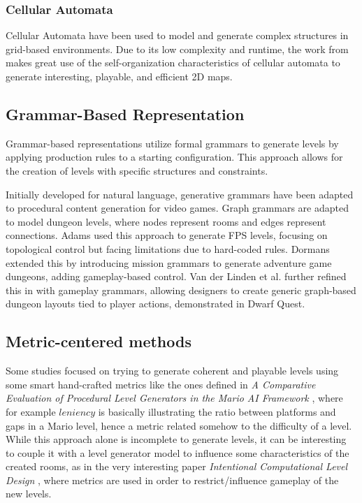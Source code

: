 \documentclass{article}
\begin{document}
\subsubsection{Cellular Automata}
Cellular Automata have been used to model and generate complex structures in grid-based environments. Due to its low complexity and runtime, the work from \cite{cellular} makes great use of the self-organization characteristics of cellular automata to generate interesting, playable, and efficient 2D maps.

\subsection{Grammar-Based Representation}
Grammar-based representations utilize formal grammars to generate levels by applying production rules to a starting configuration. This approach allows for the creation of levels with specific structures and constraints.

Initially developed for natural language, generative grammars have been adapted to procedural content generation for video games. Graph grammars are adapted to model dungeon levels, where nodes represent rooms and edges represent connections. Adams \cite{adams} used this approach to generate FPS levels, focusing on topological control but facing limitations due to hard-coded rules. Dormans \cite{dorm} extended this by introducing mission grammars to generate adventure game dungeons, adding gameplay-based control. Van der Linden et al. further refined this in \cite{linden} with gameplay grammars, allowing designers to create generic graph-based dungeon layouts tied to player actions, demonstrated in Dwarf Quest.

\subsection{Metric-centered methods}
Some studies focused on trying to generate coherent and playable levels using some smart hand-crafted metrics like the ones defined in \textit{A Comparative Evaluation of Procedural Level Generators in the Mario AI Framework} \cite{compMarioAI}, where for example $\textit{leniency}$ is basically illustrating the ratio between platforms and gaps in a Mario level, hence a metric related somehow to the difficulty of a level. While this approach alone is incomplete to generate levels, it can be interesting to couple it with a level generator model to influence some characteristics of the created rooms, as in the very interesting paper \textit{Intentional Computational Level Design} \cite{ICLD}, where metrics are used in order to restrict/influence gameplay of the new levels.
\end{document}
